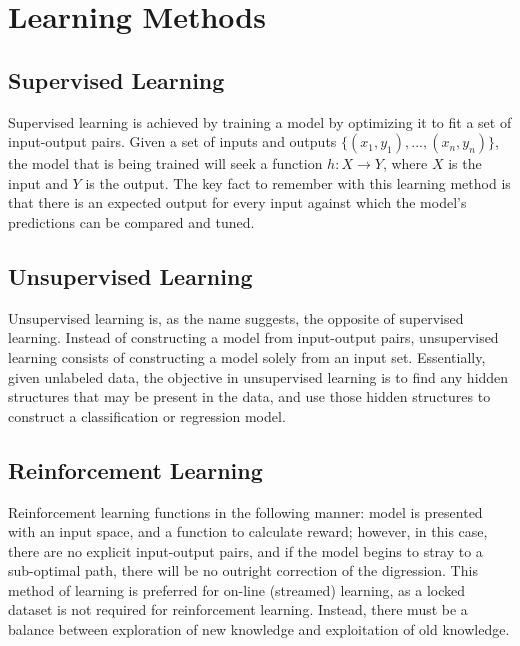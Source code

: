 \documentclass{comjnl}
\numberwithin{equation}{subsection}
\begin{document}

    \section{Learning Methods}\label{sec:learn}

        \subsection{Supervised Learning}\label{sec:sup}

            Supervised learning is achieved by training a model by optimizing it to fit a set of
            input-output pairs. Given a set of inputs and outputs $\{(x_1,y_1),...,(x_n,y_n)\}$,
            the model that is being trained will seek a function $h : X \to Y$, where $X$ is the
            input and $Y$ is the output. The key fact to remember with this learning method is that
            there is an expected output for every input against which the model's predictions can be
            compared and tuned.

        \subsection{Unsupervised Learning}\label{sec:unsup}

            Unsupervised learning is, as the name suggests, the opposite of supervised learning.
            Instead of constructing a model from input-output pairs, unsupervised learning consists
            of constructing a model solely from an input set. Essentially, given unlabeled data, the
            objective in unsupervised learning is to find any hidden structures that may be present
            in the data, and use those hidden structures to construct a classification or regression
            model.

        \subsection{Reinforcement Learning}\label{sec:rein}

            Reinforcement learning functions in the following manner: model is presented with an
            input space, and a function to calculate reward; however, in this case, there are no
            explicit input-output pairs, and if the model begins to stray to a sub-optimal path,
            there will be no outright correction of the digression. This method of learning is
            preferred for on-line (streamed) learning, as a locked dataset is not required for
            reinforcement learning. Instead, there must be a balance between exploration of new
            knowledge and exploitation of old knowledge.
\end{document}
